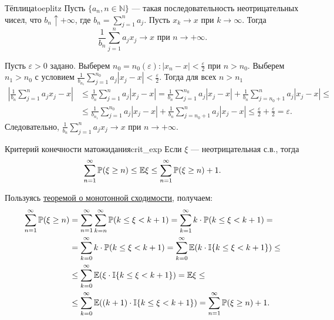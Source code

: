 \vspace{1.5em}

\begin{lemma}{Тёплица}{toeplitz}
    Пусть $\{a_n, n \in \mathbb{N}\}$ --- такая последовательность неотрицательных чисел, что $b_n \uparrow +\infty$, где $b_n = \sum_{j=1}^n a_j$. Пусть $x_k \to x$ при $k \to \infty$. Тогда
    $$ \frac{1}{b_n} \sum_{j=1}^n a_j x_j \to x \text{ при } n \to +\infty. $$
\end{lemma}

\begin{proofbox}
    Пусть $\varepsilon > 0$ задано. Выберем $n_0 = n_0(\varepsilon) \colon |x_n - x| < \frac{\varepsilon}{2}$ при $n > n_0$.
    Выберем $n_1 > n_0$ с условием $\frac{1}{b_{n_1}} \sum_{j=1}^{n_0} a_j |x_j - x| < \frac{\varepsilon}{2}$. Тогда для всех $n > n_1$
    \begin{align*}
        \left| \frac{1}{b_n} \sum_{j=1}^n a_j x_j - x \right| &\le \frac{1}{b_n} \sum_{j=1}^n a_j |x_j - x| = \frac{1}{b_n} \sum_{j=1}^{n_0} a_j |x_j - x| + \frac{1}{b_n} \sum_{j=n_0+1}^n a_j |x_j - x| \le \\
        &\le \frac{1}{b_{n_1}} \sum_{j=1}^{n_0} a_j |x_j - x| + \frac{1}{b_n} \sum_{j=n_0+1}^n a_j |x_j - x| \le \frac{\varepsilon}{2} + \frac{\varepsilon}{2} = \varepsilon.
    \end{align*}
    Следовательно, $\frac{1}{b_n} \sum_{j=1}^n a_j x_j \to x$ при $n \to +\infty$.
\end{proofbox}

\vspace{1.5em}

\begin{proposition}{Критерий конечности матожидания}{crit_exp}
    Если $\xi$ --- неотрицательная с.в., тогда
    $$ \sum_{n=1}^\infty \mathbb{P}(\xi \ge n) \le \mathbb{E} \xi \le \sum_{n=1}^\infty \mathbb{P}(\xi \ge n) + 1. $$
\end{proposition}

\begin{proofbox}
    Пользуясь \hyperref[thm:monotone]{теоремой о монотонной сходимости}, получаем:
    \begin{align*}
        \sum_{n=1}^\infty \mathbb{P}(\xi \ge n) &= \sum_{n=1}^\infty \sum_{k=n}^\infty \mathbb{P}(k \le \xi < k + 1) = \sum_{k=1}^\infty k \cdot \mathbb{P}(k \le \xi < k + 1) = \\
        &= \sum_{k=0}^\infty k \cdot \mathbb{P}(k \le \xi < k + 1) = \sum_{k=0}^\infty \mathbb{E}(k \cdot \mathbb{I}\{k \le \xi < k + 1\}) \le \\
        &\le \sum_{k=0}^\infty \mathbb{E}(\xi \cdot \mathbb{I}\{k \le \xi < k + 1\}) = \mathbb{E} \xi \le \\
        &\le \sum_{k=0}^\infty \mathbb{E}((k + 1) \cdot \mathbb{I}\{k \le \xi < k + 1\}) = \sum_{n=1}^\infty \mathbb{P}(\xi \ge n) + 1.
    \end{align*}
\end{proofbox}

